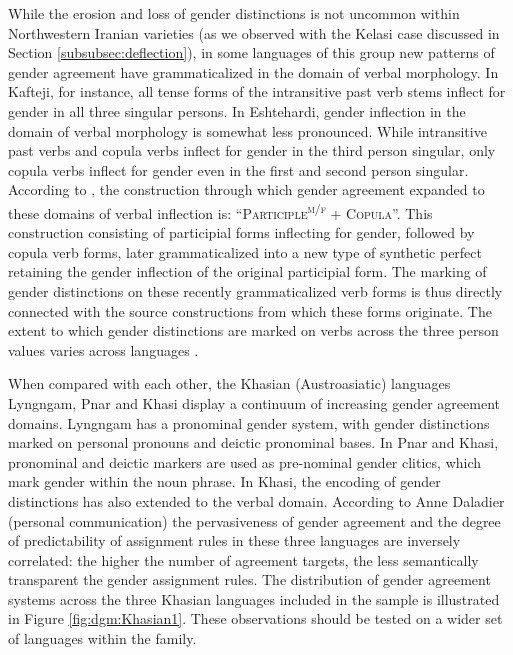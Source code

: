\documentclass[output=collectionpaper]{langsci/langscibook}
\begin{document}
While the erosion and loss of gender distinctions is not uncommon within Northwestern Iranian varieties (as we observed with the Kelasi case discussed in Section \ref{subsubsec:deflection}), in some languages of this group new patterns of gender agreement have grammaticalized in the domain of verbal morphology. In Kafteji, for instance, all tense forms of the intransitive past verb stems inflect for gender in all three singular persons. In Eshtehardi, gender inflection in the domain of verbal morphology is somewhat less pronounced. While intransitive past verbs and copula verbs inflect for gender in the third person singular, only copula verbs inflect for gender even in the first and second person singular. According to \citet{Stilotoappear}, the construction through which gender agreement expanded to these domains of verbal inflection is: ``\textsc{Participle}\textsuperscript{\textsc{m/f}} + \textsc{Copula}''. This construction consisting of participial forms  inflecting for gender, followed by copula verb forms, later grammaticalized into a new type of synthetic perfect retaining the gender inflection of the original participial form.  The marking of gender distinctions on these recently grammaticalized verb forms is thus directly connected with the source constructions from which these forms originate. The extent to which gender distinctions are marked on verbs across the three person values varies across languages \citep[29]{Stilotoappear}.

When compared with each other, the Khasian (Austroasiatic) languages Lyngngam, Pnar and Khasi display a continuum of increasing gender agreement domains. Lyngngam has a pronominal gender system, with gender distinctions marked on personal pronouns and deictic pronominal bases. In Pnar and Khasi, pronominal and deictic markers are used as pre-nominal gender clitics, which mark gender within the noun phrase. In Khasi, the encoding of gender distinctions has also extended to the verbal domain. According to Anne Daladier (personal communication) the pervasiveness of gender agreement and the degree of predictability of assignment rules in these three languages are inversely correlated: the higher the number of agreement targets, the less semantically transparent the gender assignment rules. The distribution of gender agreement systems across the three Khasian languages included in the sample is illustrated in Figure \ref{fig:dgm:Khasian1}. These observations should be tested on a wider set of languages within the family.
\end{document}

